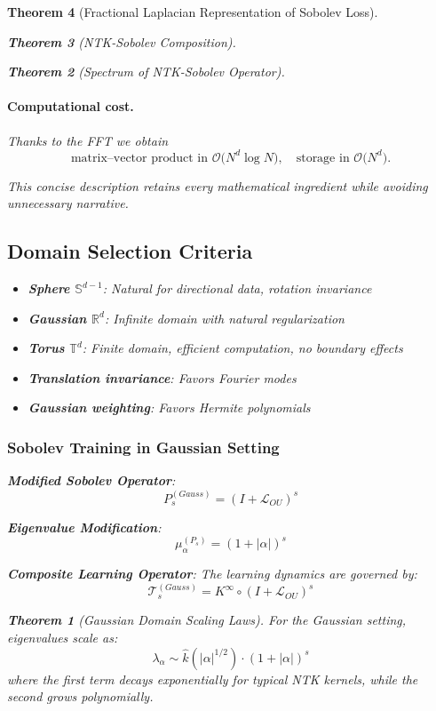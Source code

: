 \documentclass{article}
\newtheorem{theorem}{Theorem}[section]
\begin{document}
\begin{theorem}[Fractional Laplacian Representation of Sobolev Loss]
\begin{theorem}[NTK-Sobolev Composition]
\begin{theorem}[Spectrum of NTK-Sobolev Operator]
\paragraph{Computational cost.}  Thanks to the FFT we obtain
\[
   \text{matrix–vector product in }\mathcal O\bigl(N^d\log N\bigr), \quad
   \text{storage in }\mathcal O\bigl(N^d\bigr).
\]

This concise description retains every mathematical ingredient while avoiding unnecessary narrative.

\subsection{Domain Selection Criteria}

\begin{itemize}
\item \textbf{Sphere $\mathbb{S}^{d-1}$}: Natural for directional data, rotation invariance
\item \textbf{Gaussian $\mathbb{R}^d$}: Infinite domain with natural regularization  
\item \textbf{Torus $\mathbb{T}^d$}: Finite domain, efficient computation, no boundary effects
\end{itemize}

\newpage

\begin{itemize}
\item \textbf{Translation invariance}: Favors Fourier modes
\item \textbf{Gaussian weighting}: Favors Hermite polynomials
\end{itemize}

\subsubsection{Sobolev Training in Gaussian Setting}

\textbf{Modified Sobolev Operator}:
\[ P_s^{(Gauss)} = (I + \mathcal{L}_{OU})^s \]

\textbf{Eigenvalue Modification}:
\[ \mu_\alpha^{(P_s)} = (1 + |\alpha|)^s \]

\textbf{Composite Learning Operator}:
The learning dynamics are governed by:
\[ \mathcal{T}_s^{(Gauss)} = K^{\infty} \circ (I + \mathcal{L}_{OU})^s \]

\begin{theorem}[Gaussian Domain Scaling Laws]
For the Gaussian setting, eigenvalues scale as:
\[ \lambda_\alpha \sim \hat{k}(|\alpha|^{1/2}) \cdot (1 + |\alpha|)^s \]
where the first term decays exponentially for typical NTK kernels, while the second grows polynomially.
\end{theorem}


\end{theorem}
\end{theorem}
\end{theorem}
\end{document}
